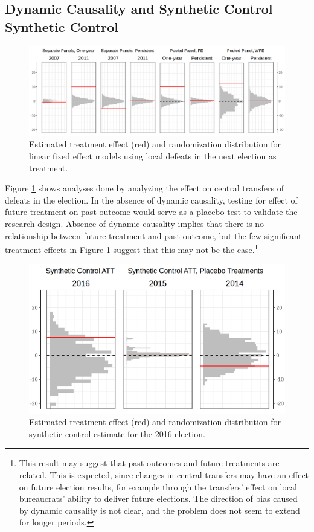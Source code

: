 \documentclass[12pt]{article}\usepackage[]{graphicx}\usepackage[]{color}
\newcommand{\1}{\mathbbm{1}}
\begin{document}
\subsection{Dynamic Causality and Synthetic Control Synthetic Control}

\begin{figure}[!htbp]
	\centering
	\includegraphics[width=\textwidth]{figure/SYP_FE_PLACE.png}
	\captionsetup{singlelinecheck=off}
	\caption[Estimated effects of future treatment]{Estimated treatment effect (red) and randomization distribution for linear fixed effect models using local defeats in the next election as treatment.}
	\label{fig:Place}
\end{figure}

Figure \ref{fig:Place} shows analyses done by analyzing the effect on central transfers of defeats in the  election. In the absence of dynamic causality, testing for effect of future treatment on past outcome would serve as a placebo test to validate the research design. Absence of dynamic causality implies that there is no relationship between future treatment and past outcome, but the few significant treatment effects in Figure \ref{fig:Place} suggest that this may not be the case.\footnote{This result may suggest that past outcomes and future treatments are related. This is expected, since changes in central transfers may have an effect on future election results, for example through the transfers' effect on local bureaucrats' ability to deliver future elections. The direction of bias caused by dynamic causality is not clear, and the problem does not seem to extend for longer periods.}

\begin{figure}[!htbp]
	\centering
	\includegraphics[width=.5\textwidth]{figure/SYP_Synth.png}
	\captionsetup{singlelinecheck=off}
	\caption[Estimated treatment effects for Synthetic Control]{Estimated treatment effect (red) and randomization distribution for synthetic control estimate for the 2016 election.}
	\label{fig:Synth}
\end{figure}
\end{document}
